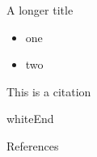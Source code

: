 {
\begin{frame}{A longer title}
    \begin{itemize}
    \item one
    \item two
    \end{itemize}

This is a citation \cite{DBLP:journals/snam/FranciaGG19}
\end{frame}
}

{
\begin{frame}
    \centering
    \vspace*{\fill}
    \begin{color}{white}\Huge End \end{color} %
    \vspace*{\fill}
\end{frame}
}


% 
% 

\begin{frame}[allowframebreaks]{References}
    \tiny
    
    
\end{frame}
